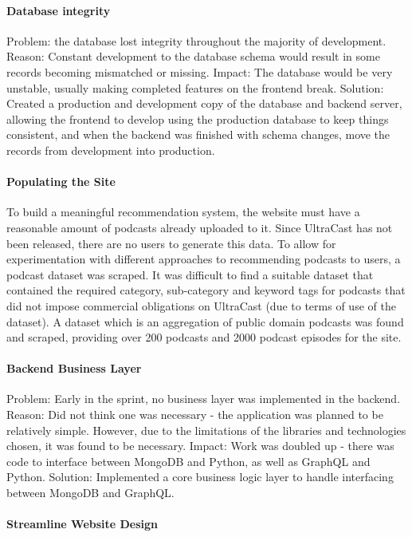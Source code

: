 \documentclass[../report.tex]{subfiles}
\begin{document}
\paragraph{Database integrity}

Problem: the database lost integrity throughout the majority of development.
Reason: Constant development to the database schema would result in some records becoming mismatched or missing.
Impact: The database would be very unstable, usually making completed features on the frontend break.
Solution: Created a production and development copy of the database and backend server, allowing the frontend to develop using the production database to keep things consistent, and when the backend was finished with schema changes, move the records from development into production.

\paragraph{Populating the Site}

To build a meaningful recommendation system, the website must have a reasonable amount of podcasts already uploaded to it.
Since UltraCast has not been released, there are no users to generate this data.
To allow for experimentation with different approaches to recommending podcasts to users, a podcast dataset was scraped.
It was difficult to find a suitable dataset that contained the required category, sub-category and keyword tags for podcasts that did not impose commercial obligations on UltraCast (due to terms of use of the dataset).
A dataset which is an aggregation of public domain podcasts was found and scraped, providing over 200 podcasts and 2000 podcast episodes for the site.

\paragraph{Backend Business Layer}

Problem: Early in the sprint, no business layer was implemented in the backend.
Reason: Did not think one was necessary - the application was planned to be relatively simple. However, due to the limitations of the libraries and technologies chosen, it was found to be necessary.
Impact: Work was doubled up - there was code to interface between MongoDB and Python, as well as GraphQL and Python.
Solution: Implemented a core business logic layer to handle interfacing between MongoDB and GraphQL.

\paragraph{Streamline Website Design}
\end{document}
